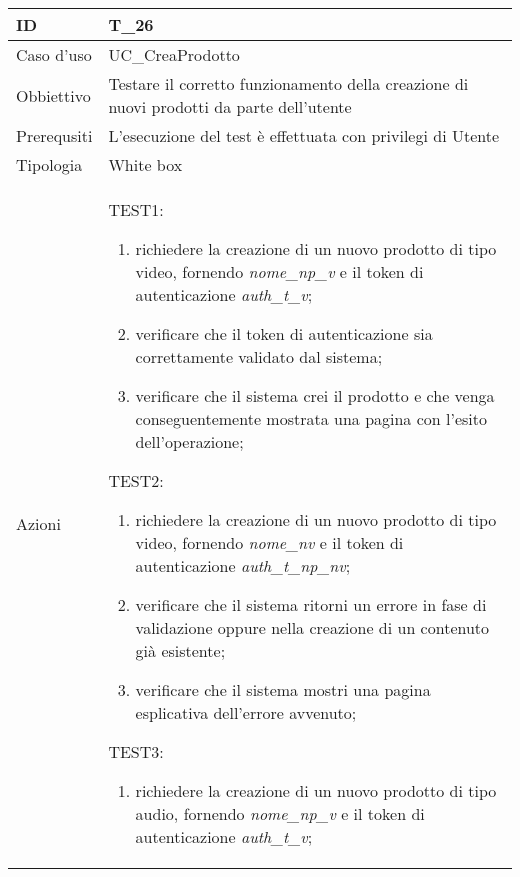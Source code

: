 \begin{table}[hb]
    \centering
    \begin{tabular}{ |p{2cm}|p{10cm}|  }
        \hline
        ID          & T\_26                                                                                    \\\hline
        Caso d'uso  & UC\_CreaProdotto                                                                         \\\hline
        Obbiettivo  & Testare il corretto funzionamento della creazione di nuovi prodotti da parte dell'utente \\\hline
        Prerequsiti & L'esecuzione del test è effettuata con privilegi di Utente                               \\\hline
        Tipologia   & White box                                                                                \\\hline
        Azioni      &
        TEST1:
        \begin{enumerate}[nosep, topsep=0pt]
            \item richiedere la creazione di un nuovo prodotto di tipo video, fornendo \emph{nome\_np\_v} e il token di autenticazione \emph{auth\_t\_v};
            \item verificare che il token di autenticazione sia correttamente validato dal sistema;
            \item verificare che il sistema crei il prodotto e che venga conseguentemente mostrata una pagina con l'esito dell'operazione;
        \end{enumerate}
        \vspace{0.5cm} TEST2:
        \begin{enumerate}[nosep, topsep=0pt]
            \item richiedere la creazione di un nuovo prodotto di tipo video, fornendo \emph{nome\_nv} e il token di autenticazione \emph{auth\_t\_np\_nv};
            \item verificare che il sistema ritorni un errore in fase di validazione oppure nella creazione di un contenuto già esistente;
            \item verificare che il sistema mostri una pagina esplicativa dell'errore avvenuto;
        \end{enumerate}
        \vspace{0.5cm}
        TEST3:
        \begin{enumerate}[nosep, topsep=0pt]
            \item richiedere la creazione di un nuovo prodotto di tipo audio, fornendo \emph{nome\_np\_v} e il token di autenticazione \emph{auth\_t\_v};

\end{enumerate}
\end{tabular}
\end{table}
